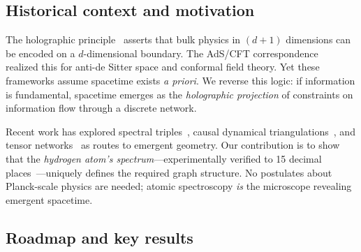 \documentclass[aps,prd,twocolumn,superscriptaddress,groupedaddress,showpacs]{revtex4-2}
\begin{document}
\subsection{Historical context and motivation}

The holographic principle~\cite{tHooft1993,Susskind1995} asserts that bulk physics in $(d+1)$ dimensions can be encoded on a $d$-dimensional boundary. The AdS/CFT correspondence~\cite{Maldacena1998} realized this for anti-de Sitter space and conformal field theory. Yet these frameworks assume spacetime exists \emph{a priori}. We reverse this logic: if information is fundamental, spacetime emerges as the \emph{holographic projection} of constraints on information flow through a discrete network.

Recent work has explored spectral triples~\cite{Connes1994}, causal dynamical triangulations~\cite{Ambjorn2012}, and tensor networks~\cite{Swingle2012} as routes to emergent geometry. Our contribution is to show that the \emph{hydrogen atom's spectrum}---experimentally verified to 15 decimal places~\cite{CODATA2018}---uniquely defines the required graph structure. No postulates about Planck-scale physics are needed; atomic spectroscopy \emph{is} the microscope revealing emergent spacetime.

\subsection{Roadmap and key results}
\end{document}

